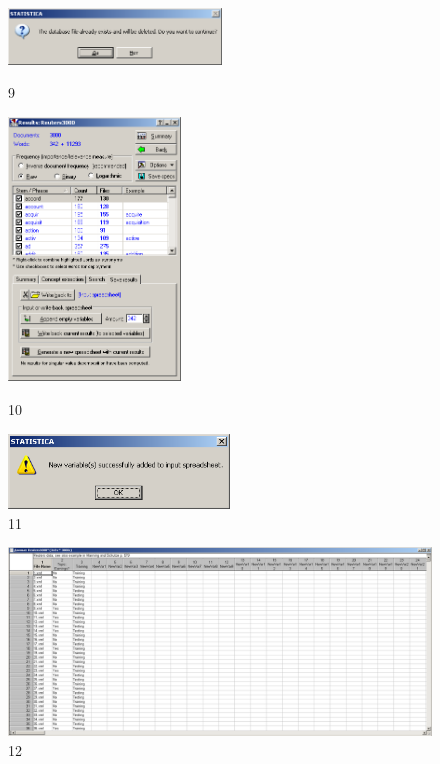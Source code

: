 \begin{figure}[!h]
  \centering

  \begin{minipage}{0.29\textwidth}
    \centering

    \includegraphics[height=1.5cm]
    {inc/9.PNG}

    \caption{9}

    \label{fig:9}
  \end{minipage}
  \begin{minipage}{0.39\textwidth}
    \centering

    \includegraphics[height=7cm]
    {inc/10.PNG}

    \caption{10}

    \label{fig:10}
  \end{minipage}
  \begin{minipage}{0.29\textwidth}
    \centering

    \includegraphics[height=2cm]
    {inc/11.PNG}

    \caption{11}

    \label{fig:11}
  \end{minipage}
\end{figure}

\begin{figure}[!h]
  \centering

  \includegraphics[width=17cm]
  {inc/12.PNG}

  \caption{12}

  \label{fig:12}
\end{figure}

